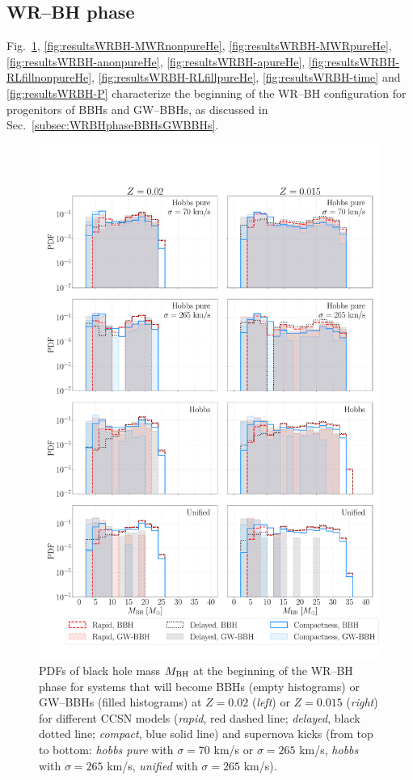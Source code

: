 \documentclass[a4paper,titlepage]{book}     	%
\begin{document}
\begin{appendices}
\subsection{WR--BH phase}\label{subapp:WRBHphaseGWBBH}
Fig.\ \ref{fig:resultsWRBH-MBH}, \ref{fig:resultsWRBH-MWRnonpureHe}, \ref{fig:resultsWRBH-MWRpureHe}, \ref{fig:resultsWRBH-anonpureHe}, \ref{fig:resultsWRBH-apureHe}, \ref{fig:resultsWRBH-RLfillnonpureHe}, \ref{fig:resultsWRBH-RLfillpureHe}, \ref{fig:resultsWRBH-time} and \ref{fig:resultsWRBH-P} characterize the beginning of the WR--BH configuration for progenitors of BBHs and GW--BBHs, as discussed in Sec.\ \ref{subsec:WRBHphaseBBHsGWBBHs}.

\begin{figure}
	\centering
	\includegraphics[width=\textwidth]{./images/WRBH-MBH.pdf}	
	\caption{PDFs of black hole mass $M_{\rm BH}$ at the beginning of the WR--BH phase for systems that will become BBHs (empty histograms) or GW--BBHs (filled histograms) at $Z=0.02$ (\emph{left}) or $Z=0.015$ (\emph{right}) for different CCSN models (\emph{rapid}, red dashed line; \emph{delayed}, black dotted line; \emph{compact}, blue solid line) and supernova kicks (from top to bottom: \emph{hobbs pure} with $\sigma = 70$ km/s or $\sigma = 265$ km/s, \emph{hobbs} with $\sigma = 265$ km/s, \emph{unified} with $\sigma = 265$ km/s).}\label{fig:resultsWRBH-MBH}
\end{figure}


\end{appendices}
\end{document}
